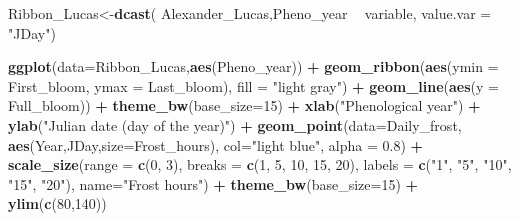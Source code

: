 \documentclass[
]{book}
\newenvironment{Shaded}{\begin{snugshade}}{\end{snugshade}}
\newcommand{\DataTypeTok}[1]{\textcolor[rgb]{0.13,0.29,0.53}{#1}}
\newcommand{\DecValTok}[1]{\textcolor[rgb]{0.00,0.00,0.81}{#1}}
\newcommand{\FloatTok}[1]{\textcolor[rgb]{0.00,0.00,0.81}{#1}}
\newcommand{\KeywordTok}[1]{\textcolor[rgb]{0.13,0.29,0.53}{\textbf{#1}}}
\newcommand{\NormalTok}[1]{#1}
\newcommand{\OperatorTok}[1]{\textcolor[rgb]{0.81,0.36,0.00}{\textbf{#1}}}
\newcommand{\StringTok}[1]{\textcolor[rgb]{0.31,0.60,0.02}{#1}}
\begin{document}
\begin{Shaded}
\begin{Highlighting}[]
\NormalTok{Ribbon_Lucas<-}\KeywordTok{dcast}\NormalTok{(}
\NormalTok{  Alexander_Lucas,Pheno_year }\OperatorTok{~}\StringTok{ }\NormalTok{variable, }\DataTypeTok{value.var =} \StringTok{"JDay"}\NormalTok{)}

\KeywordTok{ggplot}\NormalTok{(}\DataTypeTok{data=}\NormalTok{Ribbon_Lucas,}\KeywordTok{aes}\NormalTok{(Pheno_year)) }\OperatorTok{+}
\StringTok{  }\KeywordTok{geom_ribbon}\NormalTok{(}\KeywordTok{aes}\NormalTok{(}\DataTypeTok{ymin =}\NormalTok{ First_bloom, }\DataTypeTok{ymax =}\NormalTok{ Last_bloom),}
              \DataTypeTok{fill =} \StringTok{"light gray"}\NormalTok{) }\OperatorTok{+}
\StringTok{  }\KeywordTok{geom_line}\NormalTok{(}\KeywordTok{aes}\NormalTok{(}\DataTypeTok{y =}\NormalTok{ Full_bloom)) }\OperatorTok{+}
\StringTok{  }\KeywordTok{theme_bw}\NormalTok{(}\DataTypeTok{base_size=}\DecValTok{15}\NormalTok{) }\OperatorTok{+}
\StringTok{  }\KeywordTok{xlab}\NormalTok{(}\StringTok{"Phenological year"}\NormalTok{) }\OperatorTok{+}
\StringTok{  }\KeywordTok{ylab}\NormalTok{(}\StringTok{"Julian date (day of the year)"}\NormalTok{) }\OperatorTok{+}
\StringTok{  }\KeywordTok{geom_point}\NormalTok{(}\DataTypeTok{data=}\NormalTok{Daily_frost,}
             \KeywordTok{aes}\NormalTok{(Year,JDay,}\DataTypeTok{size=}\NormalTok{Frost_hours),}
             \DataTypeTok{col=}\StringTok{"light blue"}\NormalTok{,}
             \DataTypeTok{alpha =} \FloatTok{0.8}\NormalTok{) }\OperatorTok{+}\StringTok{ }
\StringTok{  }\KeywordTok{scale_size}\NormalTok{(}\DataTypeTok{range =} \KeywordTok{c}\NormalTok{(}\DecValTok{0}\NormalTok{, }\DecValTok{3}\NormalTok{),}
             \DataTypeTok{breaks =} \KeywordTok{c}\NormalTok{(}\DecValTok{1}\NormalTok{, }\DecValTok{5}\NormalTok{, }\DecValTok{10}\NormalTok{, }\DecValTok{15}\NormalTok{, }\DecValTok{20}\NormalTok{),}
             \DataTypeTok{labels =} \KeywordTok{c}\NormalTok{(}\StringTok{"1"}\NormalTok{, }\StringTok{"5"}\NormalTok{, }\StringTok{"10"}\NormalTok{, }\StringTok{"15"}\NormalTok{, }\StringTok{"20"}\NormalTok{),}
             \DataTypeTok{name=}\StringTok{"Frost hours"}\NormalTok{) }\OperatorTok{+}
\StringTok{  }\KeywordTok{theme_bw}\NormalTok{(}\DataTypeTok{base_size=}\DecValTok{15}\NormalTok{) }\OperatorTok{+}
\StringTok{  }\KeywordTok{ylim}\NormalTok{(}\KeywordTok{c}\NormalTok{(}\DecValTok{80}\NormalTok{,}\DecValTok{140}\NormalTok{))}
\end{Highlighting}
\end{Shaded}
\end{document}
